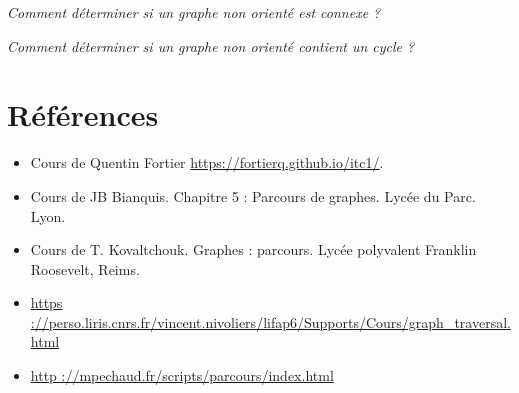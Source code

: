 \begin{exemple}
\textit{Comment déterminer si un graphe non orienté est connexe ?}
\end{exemple}


\begin{exemple}
\textit{Comment déterminer si un graphe non orienté contient un cycle ?}
\end{exemple}

\section*{Références}

\begin{itemize}
\item Cours de Quentin Fortier \url{https://fortierq.github.io/itc1/}.
\item Cours de JB Bianquis. Chapitre 5 : Parcours de graphes. Lycée du Parc. Lyon.
\item Cours de T. Kovaltchouk. Graphes : parcours. Lycée polyvalent Franklin Roosevelt, Reims.
\item \url{https ://perso.liris.cnrs.fr/vincent.nivoliers/lifap6/Supports/Cours/graph_traversal.html}
\item \url{http ://mpechaud.fr/scripts/parcours/index.html}
\end{itemize}